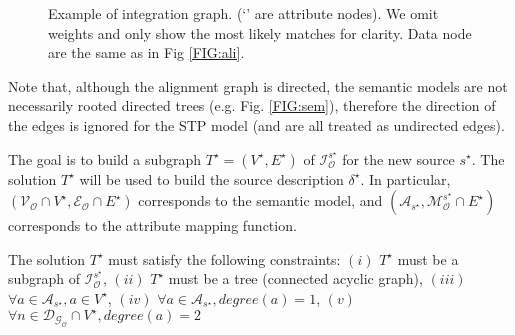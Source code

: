 \documentclass[letterpaper]{article} %
\begin{document}
\begin{figure}[ht]
\caption{Example of integration graph. (`' are attribute nodes). We omit weights and only show the most likely 
matches for clarity. Data node
are the same as in Fig \ref{FIG:ali}.}
\label{FIG:inte}
\end{figure}

Note that, although the alignment graph is directed, the semantic models are 
not necessarily rooted directed trees (e.g. Fig. \ref{FIG:sem}), therefore the 
direction of the edges is ignored for the STP model (and are all treated as 
undirected edges). 

The goal is to build a subgraph $T^\star= (V^\star, E^\star)$ of
$\mathcal{I}_\mathcal{O}^{s^\star}$ for the new source $s^\star$. The solution 
$T^\star$ will 
be used to build the source description $\delta^\star$. 
In particular, $(\mathcal{V_O} \cap V^\star,\mathcal{E_O} \cap E^\star)$ 
corresponds to the semantic model, and 
$(\mathcal{A}_{s^\star},\mathcal{M}_\mathcal{O}^{s^\star} \cap E^\star)$ 
corresponds to 
the attribute mapping function.

The solution $T^\star$ must satisfy the following constraints:
	$(i)$ %
	$T^\star$ must be a subgraph of $\mathcal{I}_\mathcal{O}^{s^\star}$,
	$(ii)$ %
	$T^\star$ must be a tree (connected acyclic graph),
	$(iii)$ %
	$\forall a \in \mathcal{A}_{s^\star}, a\in V^\star$,
	$(iv)$ %
	$\forall a \in \mathcal{A}_{s^\star}, degree(a) = 1$,
	$(v)$ %
	$\forall n \in \mathcal{D_{G_O}} \cap V^\star, degree(a) = 2$
\end{document}
